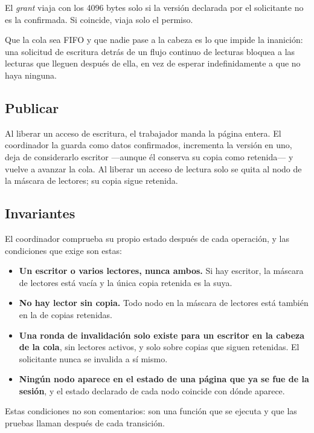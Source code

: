 El \emph{grant} viaja con los 4096 bytes solo si la versión declarada por el
solicitante no es la confirmada. Si coincide, viaja solo el permiso.

Que la cola sea FIFO y que nadie pase a la cabeza es lo que impide la
inanición: una solicitud de escritura detrás de un flujo continuo de lecturas
bloquea a las lecturas que lleguen después de ella, en vez de esperar
indefinidamente a que no haya ninguna.

\subsection{Publicar}

Al liberar un acceso de escritura, el trabajador manda la página entera. El
coordinador la guarda como datos confirmados, incrementa la versión en uno,
deja de considerarlo escritor —aunque él conserva su copia como retenida— y
vuelve a avanzar la cola. Al liberar un acceso de lectura solo se quita al
nodo de la máscara de lectores; su copia sigue retenida.

\subsection{Invariantes}

El coordinador comprueba su propio estado después de cada operación, y las
condiciones que exige son estas:

\begin{itemize}
\item \textbf{Un escritor o varios lectores, nunca ambos.} Si hay escritor, la
      máscara de lectores está vacía y la única copia retenida es la suya.
\item \textbf{No hay lector sin copia.} Todo nodo en la máscara de lectores
      está también en la de copias retenidas.
\item \textbf{Una ronda de invalidación solo existe para un escritor en la
      cabeza de la cola}, sin lectores activos, y solo sobre copias que siguen
      retenidas. El solicitante nunca se invalida a sí mismo.
\item \textbf{Ningún nodo aparece en el estado de una página que ya se fue de
      la sesión}, y el estado declarado de cada nodo coincide con dónde
      aparece.
\end{itemize}

Estas condiciones no son comentarios: son una función que se ejecuta y que las
pruebas llaman después de cada transición.

